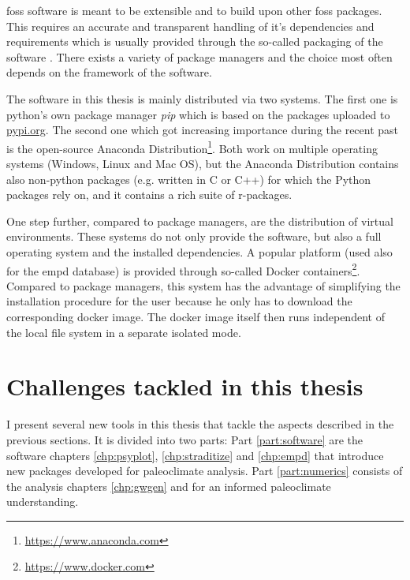 \begin{refsection}
\gls{foss} software is meant to be extensible and to build upon other \gls{foss} packages. This requires an accurate and transparent handling of it's dependencies and requirements which is usually provided through the so-called packaging of the software \citep[e.g.][]{Torborg2016}. There exists a variety of package managers and the choice most often depends on the framework of the software.

The software in this thesis is mainly distributed via two systems. The first one is python's own package manager \textit{pip} which is based on the packages uploaded to \href{https://pypi.org/}{pypi.org}. The second one which got increasing importance during the recent past is the open-source Anaconda Distribution\footnote{\url{https://www.anaconda.com}}. Both work on multiple operating systems (Windows, Linux and Mac OS), but the Anaconda Distribution contains also non-python packages (e.g. written in C or C++) for which the Python packages rely on, and it contains a rich suite of r-packages.

One step further, compared to package managers, are the distribution of virtual environments. These systems do not only provide the software, but also a full operating system and the installed dependencies. A popular platform (used also for the \gls{empd} database) is provided through so-called Docker containers\footnote{\url{https://www.docker.com}}. Compared to package managers, this system has the advantage of simplifying the installation procedure for the user because he only has to download the corresponding docker image. The docker image itself then runs independent of the local file system in a separate isolated mode.



\section{Challenges tackled in this thesis} \label{sec:intro-thesis-overview}

I present several new tools in this thesis that tackle the aspects described in the previous sections. It is divided into two parts: Part \ref{part:software} are the software chapters \ref{chp:psyplot}, \ref{chp:straditize} and \ref{chp:empd} that introduce new packages developed for paleoclimate analysis. Part \ref{part:numerics} consists of the analysis chapters \ref{chp:gwgen} and  for an informed paleoclimate understanding.


\end{refsection}
